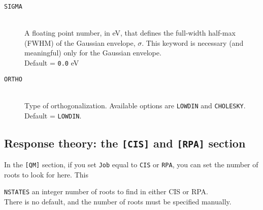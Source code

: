 \documentclass[12pt]{article}
\begin{document}
\begin{description}
      \item[\texttt{SIGMA}] \hfill \\ 
         A floating point number, in eV, that defines the full-width half-max (FWHM) of the Gaussian envelope, $\sigma$. This keyword is necessary (and meaningful) only for the Gaussian envelope.  \\
         Default = \texttt{0.0} eV
      \item[\texttt{ORTHO}] \hfill \\ 
       Type of orthogonalization. Available options are \texttt{LOWDIN} and \texttt{CHOLESKY}. \\ 
       Default = \texttt{LOWDIN}.
    \end{description}
    \subsection{Response theory: the \texttt{[CIS]} and \texttt{[RPA]} section} \label{subsec:ResponseInput}
    In the \texttt{[QM]} section, if you set \texttt{Job} equal to \texttt{CIS} or \texttt{RPA}, you can set the number of roots to look for here. This  
     \begin{description}
       \item{\texttt{NSTATES}} an integer number of roots to find in either CIS or RPA. \\
       There is no default, and the number of roots must be specified manually.
     \end{description}

    
    
    
\end{document}
